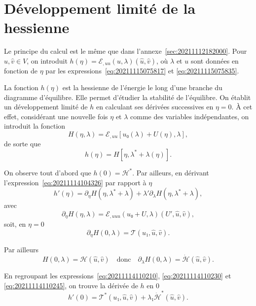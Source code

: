 \documentclass[12pt, final]{amsart}
\begin{document}
\section{Développement limité de la hessienne}
\label{sec:20211115081016}

Le principe du calcul est le même que dans
l'annexe~\ref{sec:20211112182000}. Pour \(\hat{u}, \hat{v}∈ V\), on introduit
\(h(η)=ℰ_{,uu}(u, λ)(\hat{u}, \hat{v})\), où \(λ\) et
\(u\) sont données en fonction de \(η\) par les
expressions~\eqref{eq:20211115075817} et \eqref{eq:20211115075835}.

La fonction \(h(η)\) est la hessienne de l'énergie le long d'une branche du
diagramme d'équilibre. Elle permet d'étudier la stabilité de l'équilibre. On
établit un développement limité de \(h\) en calculant ses dérivées successives
en \(η=0\). \`A cet effet, considérant une nouvelle fois \(η\) et
\(λ\) comme des variables indépendantes, on introduit la fonction
\begin{equation}
  H(η, λ)=ℰ_{,uu}[u₀(λ)+U(η), λ],
\end{equation}
de sorte que
\begin{equation}
  \label{eq:20211114104326}
  h(η)=H[η, λ^*+λ(η)].
\end{equation}

On observe tout d'abord que \(h(0)=ℋ^*\). Par ailleurs, en dérivant
l'expression~\eqref{eq:20211114104326} par rapport à \(η\)
\begin{equation}
  \label{eq:20211114110210}
  h'(η)=\partial_η H(η, λ^*+λ)
  +λ'\partial_λ H(η, λ^*+λ),
\end{equation}
avec
\begin{equation}
  \label{eq:20211114110852}
  \partial_η H(η, λ)=ℰ_{,uuu}(u₀+U, λ)(U', \hat{u}, \hat{v}),
\end{equation}
soit, en \(η=0\)
\begin{equation}
  \label{eq:20211114110230}
  \partial_η H(0, λ)=𝒯(u₁, \hat{u}, \hat{v}).
\end{equation}

Par ailleurs
\begin{equation}
  \label{eq:20211114110245}
  H(0, λ)=ℋ(\hat{u}, \hat{v})
  \quad\text{donc}\quad
  \partial_λ H(0, λ)=\dot{ℋ}(\hat{u}, \hat{v}).
\end{equation}

En regroupant les expressions~\eqref{eq:20211114110210},
\eqref{eq:20211114110230} et \eqref{eq:20211114110245}, on trouve la dérivée de
\(h\) en 0
\begin{equation}
  h'(0)=𝒯^*(u₁, \hat{u}, \hat{v})
  +λ₁\dot{ℋ}^*(\hat{u}, \hat{v}).
\end{equation}
\end{document}
